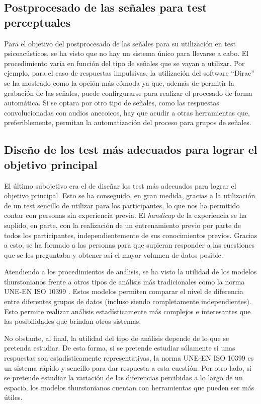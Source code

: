 \documentclass[11pt,a4paper]{book}
\begin{document}
        \subsection*{Postprocesado de las señales para test perceptuales}
            Para el objetivo del postprocesado de las señales para su utilización en test psicoacústicos, se ha visto que no hay un sistema único para llevarse a cabo. El procedimiento varía en función del tipo de señales que se vayan a utilizar. Por ejemplo, para el caso de respuestas impulsivas, la utilización del software ``Dirac'' se ha mostrado como la opción más cómoda ya que, además de permitir la grabación de las señales, puede confirgurarse para realizar el procesado de forma automática. Si se optara por otro tipo de señales, como las respuestas convolucionadas con audios anecoicos, hay que acudir a otras herramientas que, preferiblemente, permitan la automatización del proceso para grupos de señales.
        
        \subsection*{Diseño de los test más adecuados para lograr el objetivo principal}
            El último subojetivo era el de diseñar los test más adecuados para lograr el objetivo principal. Esto se ha conseguido, en gran medida, gracias a la utilización de un test sencillo de utilizar para los participantes, lo que nos ha permitido contar con personas sin experiencia previa. El \textit{handicap} de la experiencia se ha suplido, en parte, con la realización de un entrenamiento previo por parte de todos los participantes, independientemente de sus conocimientos previos. Gracias a esto, se ha formado a las personas para que supieran responder a las cuestiones que se les preguntaba y obtener así el mayor volumen de datos posible. 
    
            Atendiendo a los procedimientos de análisis, se ha visto la utilidad de los modelos thurstonianos frente a otros tipos de análisis más tradicionales como la norma UNE-EN ISO 10399 \cite{ISO10399}. Estos modelos permiten comparar el nivel de diferencia entre diferentes grupos de datos (incluso siendo completamente independientes). Esto permite realizar análisis estadísticamente más complejos e interesantes que las posibilidades que brindan otros sistemas. 
    
            No obstante, al final, la utilidad del tipo de análisis depende de lo que se pretenda estudiar. De esta forma, si se pretende estudiar sólamente si unas respuestas son estadísticamente representativas, la norma UNE-EN ISO 10399 es un sistema rápido y sencillo para dar respuesta a esta cuestión. Por otro lado, si se pretende estudiar la variación de las diferencias percibidas a lo largo de un espacio, los modelos thurstonianos cuentan con herramientas que pueden ser más útiles. 
    
\end{document}
